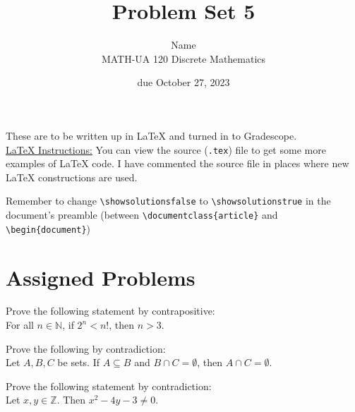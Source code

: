 \documentclass{article}
\title{Problem Set 5}
\author{%
    Name
\\  MATH-UA 120 Discrete Mathematics
}
\date{due October 27, 2023}
\newif\ifshowsolutions
\newcommand{\danger}{\marginpar[\hfill\dbend]{\dbend\hfill}}
\newcommand{\Z}{\mathbb{Z}}
\theoremstyle{definition}
\begin{document}
\maketitle



These are to be written up in \LaTeX{} and turned in to Gradescope.\\



\ifshowsolutions
    \SetupExSheets{solution/print=true}
\else
    \danger
 \underline{ \LaTeX{}  Instructions:}  You can view the source (\texttt{.tex}) file to get some more examples of \LaTeX{} code.  I have commented the source file in places where new \LaTeX{} constructions are used.
  
  Remember to change \verb|\showsolutionsfalse| to \verb|\showsolutionstrue|
    in the document's preamble 
    (between \verb|\documentclass{article}| and \verb|\begin{document}|)
\fi

\section*{Assigned Problems}

\begin{question}
    Prove the following statement by contrapositive: \\
    For all $n\in \mathbb{N}$, if $2^n<n!$, then $n>3$.
\end{question}
\begin{solution}
\end{solution}


\begin{question}
    Prove the following by contradiction:\\
    Let $A, B, C$ be sets. If $A\subseteq B$ and $B\cap C=\emptyset$, then $A\cap C=\emptyset$.
\end{question}
\begin{solution}
\end{solution}

\begin{question}
    Prove the following statement by contradiction:\\
    Let $x, y\in \Z$. Then $x^2-4y-3\neq 0$.
\end{question}
\begin{solution}
\end{solution}
\end{document}
